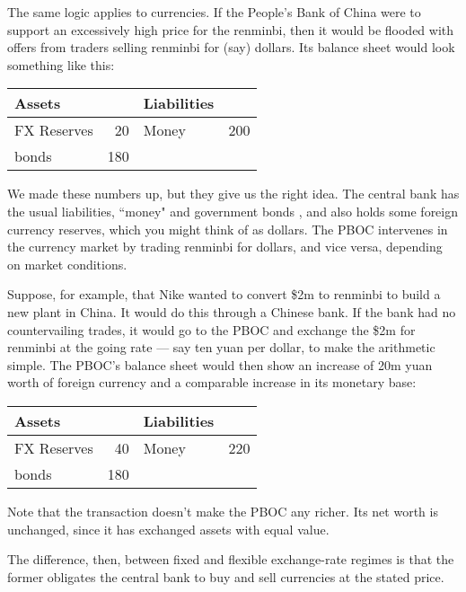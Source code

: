 The same logic applies to currencies.
If the People's Bank of China were to support an excessively high price for
the renminbi, then it would be flooded with offers from traders
selling renminbi for (say) dollars.
Its balance sheet would look something like this:
%
\begin{center}
\begin{tabular}{lr|lr}
               Assets  &     &     Liabilities                     \\
               \hline
               FX Reserves &  20 &     Money &  200   \\
               bonds   & 180 & \\
\end{tabular}
\end{center}
%
We made these numbers up, but they give us the right idea.
The central bank  has the usual liabilities,
``money" and government bonds ,
and also holds some foreign currency reserves,
which you might think of as dollars.
The PBOC intervenes in the currency market by trading renminbi for dollars,
and vice versa, depending on market conditions.


Suppose, for example, that Nike wanted to convert
\$2m to renminbi to build a new plant in China.
It would do this through a Chinese bank.
If the bank had no countervailing trades, it would
go to the PBOC and exchange the \$2m for renminbi at the going rate --- say ten yuan per dollar, to make the arithmetic simple.
The PBOC's balance sheet would then show an increase of
20m yuan worth of foreign currency
and a comparable increase in its monetary base:
%
\begin{center}
\begin{tabular}{lr|lr}
               Assets  &     &     Liabilities                     \\
               \hline
               FX Reserves &  40 &     Money &  220   \\
               bonds \index{bond}  & 180 &
\end{tabular}
\end{center}
%
Note that the transaction doesn't make the PBOC any richer.
Its net worth is unchanged,
since it has exchanged assets with equal value.

The difference, then, between fixed and flexible exchange-rate regimes
is that the former obligates the central bank  to buy and sell
currencies at the stated price.


